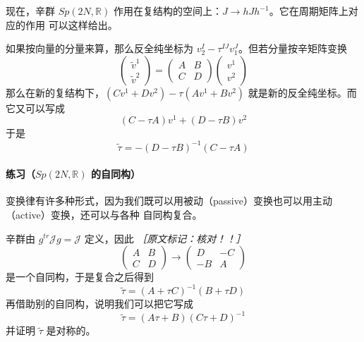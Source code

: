 现在，辛群 $Sp(2N,\mathbb{R})$ 作用在复结构的空间上：$J\to hJh^{-1}$。它在周期矩阵上对应的作用
可以这样给出。

如果按向量的分量来算，那么反全纯坐标为 $v_2^I-\tau^{IJ}v_1^J$。但若分量按辛矩阵变换
\begin{equation}
  \begin{pmatrix}\tilde v^1\\ \tilde v^2\end{pmatrix}
  = \begin{pmatrix} A & B\\ C & D\end{pmatrix}
  \begin{pmatrix} v^1\\ v^2\end{pmatrix}
  \tag{E.36}
  \label{eq:E.36}
\end{equation}
那么在新的复结构下，$(Cv^1+Dv^2)-\tau(Av^1+Bv^2)$ 就是新的反全纯坐标。而它又可以写成
\begin{equation}
  (C-\tau A)v^1+(D-\tau B)v^2
  \tag{E.37}
  \label{eq:E.37}
\end{equation}
于是
\begin{equation}
  \tilde\tau = -(D-\tau B)^{-1}(C-\tau A)
  \tag{E.38}
  \label{eq:E.38}
\end{equation}

\paragraph{练习（$Sp(2N,\mathbb{R})$ 的自同构）}
变换律有许多种形式，因为我们既可以用被动（passive）变换也可以用主动（active）变换，还可以与各种
自同构复合。

辛群由 $g^{tr}\mathcal{J}g=\mathcal{J}$ 定义，因此
{\small\itshape ［原文标记：核对！！］}
\begin{equation}
  \begin{pmatrix} A & B\\ C & D\end{pmatrix}
  \to
  \begin{pmatrix} D & -C\\ -B & A\end{pmatrix}
  \tag{E.39}
  \label{eq:E.39}
\end{equation}
是一个自同构，于是复合之后得到
\begin{equation}
  \tilde\tau = (A+\tau C)^{-1}(B+\tau D)
  \tag{E.40}
  \label{eq:E.40}
\end{equation}
再借助别的自同构，说明我们可以把它写成
\begin{equation}
  \tilde\tau = (A\tau+B)(C\tau+D)^{-1}
  \tag{E.41}
  \label{eq:E.41}
\end{equation}
并证明 $\tilde\tau$ 是对称的。

